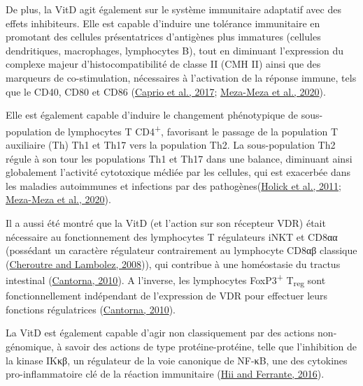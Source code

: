 \documentclass[
  letterpaper,
  DIV=11,
  numbers=noendperiod]{scrartcl}
\begin{document}
De plus, la VitD agit également sur le système immunitaire adaptatif
avec des effets inhibiteurs. Elle est capable d'induire une tolérance
immunitaire en promotant des cellules présentatrices d'antigènes plus
immatures (cellules dendritiques, macrophages, lymphocytes B), tout en
diminuant l'expression du complexe majeur d'histocompatibilité de classe
II (CMH II) ainsi que des marqueurs de co-stimulation, nécessaires à
l'activation de la réponse immune, tels que le CD40, CD80 et CD86
(\protect\hyperlink{ref-Caprio.2017}{Caprio et al., 2017};
\protect\hyperlink{ref-Meza-Meza.2020}{Meza-Meza et al., 2020}).

Elle est également capable d'induire le changement phénotypique de
sous-population de lymphocytes T CD4\textsuperscript{+}, favorisant le
passage de la population T auxiliaire (Th) Th1 et Th17 vers la
population Th2. La sous-population Th2 régule à son tour les populations
Th1 et Th17 dans une balance, diminuant ainsi globalement l'activité
cytotoxique médiée par les cellules, qui est exacerbée dans les maladies
autoimmunes et infections par des
pathogènes(\protect\hyperlink{ref-Holick.2011}{Holick et al., 2011};
\protect\hyperlink{ref-Meza-Meza.2020}{Meza-Meza et al., 2020}).

Il a aussi été montré que la VitD (et l'action sur son récepteur VDR)
était nécessaire au fonctionnement des lymphocytes T régulateurs iNKT et
CD8αα (possédant un caractère régulateur contrairement au lymphocyte
CD8αβ classique (\protect\hyperlink{ref-Cheroutre.2008}{Cheroutre and
Lambolez, 2008})), qui contribue à une homéostasie du tractus intestinal
(\protect\hyperlink{ref-Cantorna.2010}{Cantorna, 2010}). A l'inverse,
les lymphocytes FoxP3\textsuperscript{+} T\textsubscript{reg} sont
fonctionnellement indépendant de l'expression de VDR pour effectuer
leurs fonctions régulatrices
(\protect\hyperlink{ref-Cantorna.2010}{Cantorna, 2010}).

La VitD est également capable d'agir non classiquement par des actions
non-génomique, à savoir des actions de type protéine-protéine, telle que
l'inhibition de la kinase IKκβ, un régulateur de la voie canonique de
NF-κB, une des cytokines pro-inflammatoire clé de la réaction
immunitaire (\protect\hyperlink{ref-Hii.2016}{Hii and Ferrante, 2016}).
\end{document}
